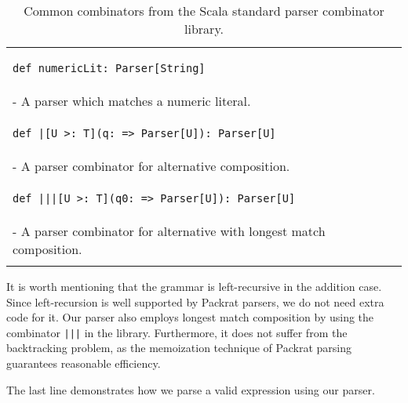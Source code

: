 \begin{table}[t]
\begin{tabular}{l}
\hline
\begin{lstlisting}
def numericLit: Parser[String]
\end{lstlisting} \\
\hspace{.2in}- A parser which matches a numeric literal. \\
\hline
\begin{lstlisting}
def |[U >: T](q: => Parser[U]): Parser[U]
\end{lstlisting} \\
\hspace{.2in}- A parser combinator for alternative composition. \\
\hline
\begin{lstlisting}
def |||[U >: T](q0: => Parser[U]): Parser[U]
\end{lstlisting} \\
\hspace{.2in}- A parser combinator for alternative with longest match composition. \\
\hline \\
\end{tabular}
\caption{Common combinators from the Scala standard parser combinator library.}\label{tab:packrat}
\end{table}

It is worth mentioning that the grammar is left-recursive in the addition case. Since left-recursion is well supported by Packrat parsers, we do not need extra code for it. Our parser also employs longest match composition by using the combinator \lstinline{|||} in the library. Furthermore, it does not suffer from the backtracking problem, as the memoization technique of Packrat parsing guarantees reasonable efficiency.

The last line demonstrates how we parse a valid expression  using our parser.

